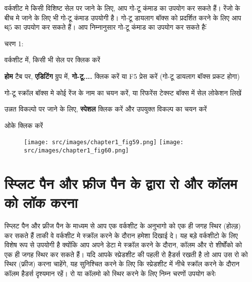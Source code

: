 वर्कशीट मे किसी विशिष्ट सेल पर जाने के लिए, आप गो-टू कंमाड का उपयोग कर सकते हैं। रेंजो के बीच मे जाने के लिए भी गो-टू कंमाड उपयोगी है। गो-टू डायलाग बॉक्स को प्रदर्शित करने के लिए आप थ्5 का उपयोग कर सकते हैं। आप निम्नानुसार गो-टू कंमाड का उपयोग कर सकते हैःं

\begin{descriptionSimple}{चरण 1:}
\item[चरण 1] वर्कशीट में, किसी भी सेल पर क्लिक करें
\item[चरण 2] \textbf{होम} टैब पर, \textbf{एडिटिंग} ग्रुप में, \textbf{गो-टू....} क्लिक करें या  {\rm F5}  प्रेस करें (गो-टू डायलाग बॉक्स प्रकट होगा)
\item[चरण 3] गो-टू स्क्रॉल बॉक्स मे कोई रेंज के नाम का चयन करें, या रिफरेंस टेक्स्ट बॉक्स में सेल लोकेशन लिखें
\item[चरण 4] उन्नत विकल्पो पर जाने के लिए, \textbf{स्पेशल} क्लिक करें और उपयुक्त विकल्प का चयन करें
\item[चरण 5] ओके क्लिक करें
\end{descriptionSimple}
\begin{figure}[H]
\centering
\texttt{[image: src/images/chapter1\_fig59.png]}\qquad
\texttt{[image: src/images/chapter1\_fig60.png]}
\end{figure}				

\section{स्प्लिट पैन और फ्रीज पैन के द्वारा रो और कॉलम को लॉक करना}\label{id-1.38}

स्प्लिट पैन और फ्रीज पैन के माध्यम से आप एक वर्कशीट के अनुभागो को एक ही जगह स्थिर (होल्ड़) कर सकते हैं ताकी वे वर्कशीट मे स्क्रॉल करने के दौरान हमेशा दिखाई दे। यह बड़े वर्कशीटो के लिए विशेष रूप से उपयोगी है क्योंकि आप अपने डेटा मे स्क्रॉल करने के दौरान, कॉलम और रो शीर्षोंको को एक ही जगह स्थिर कर सकते हैं। यदि आपके स्प्रेडशीट की पहली रो हैडर्स रखती है तो आप उस रो को स्थिर (फ्रीज) करना चाहेंगे, यह सुनिश्चित करने के लिए कि स्प्रेडशीट में नीचे स्क्रॉल करने के दौरान कॉलम हैडर्स दृश्यमान रहें। रो या कॉलमो को स्थिर करने के लिए निम्न चरणों उपयोग करेः 

